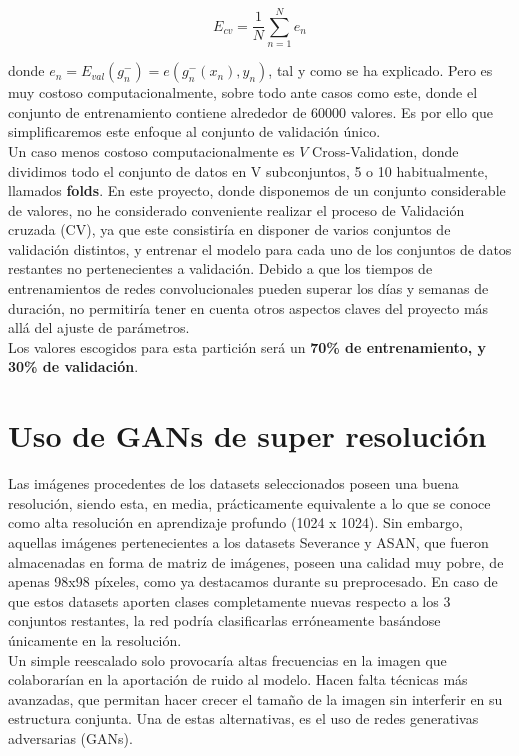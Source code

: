 $$E_{cv} = \frac{1}{N}\sum^{N}_{n=1} e_n$$

donde $e_n = E_{val}(g^-_n) = e(g_n^-(x_n),y_n)$, tal y como se ha explicado. Pero es muy costoso computacionalmente, sobre todo ante casos como este, donde el conjunto de entrenamiento contiene alrededor de 60000 valores. Es por ello que simplificaremos este enfoque al conjunto de validación único.\\

Un caso menos costoso computacionalmente es $V$ Cross-Validation, donde dividimos todo el conjunto de datos en V subconjuntos, 5 o 10 habitualmente, llamados \textbf{folds}. En este proyecto, donde disponemos de un conjunto considerable de valores, no he considerado conveniente realizar el proceso de Validación cruzada (CV), ya que este consistiría en disponer de varios conjuntos de validación distintos, y entrenar el modelo para cada uno de los conjuntos de datos restantes no pertenecientes a validación. Debido a que los tiempos de entrenamientos de redes convolucionales pueden superar los días y semanas de duración, no permitiría tener en cuenta otros aspectos claves del proyecto más allá del ajuste de parámetros.\\

Los valores escogidos para esta partición será un \textbf{70\% de entrenamiento, y 30\% de validación}.

\section{Uso de GANs de super resolución}

Las imágenes procedentes de los datasets seleccionados poseen una buena resolución, siendo esta, en media, prácticamente equivalente a lo que se conoce como alta resolución en aprendizaje profundo (1024 x 1024). Sin embargo, aquellas imágenes pertenecientes a los datasets Severance y ASAN, que fueron almacenadas en forma de matriz de imágenes, poseen una calidad muy pobre, de apenas 98x98 píxeles, como ya destacamos durante su preprocesado. En caso de que estos datasets aporten clases completamente nuevas respecto a los 3 conjuntos restantes, la red podría clasificarlas erróneamente basándose únicamente en la resolución.\\

Un simple reescalado solo provocaría altas frecuencias en la imagen que colaborarían en la aportación de ruido al modelo. Hacen falta técnicas más avanzadas, que permitan hacer crecer el tamaño de la imagen sin interferir en su estructura conjunta. Una de estas alternativas, es el uso de redes generativas adversarias (GANs).

